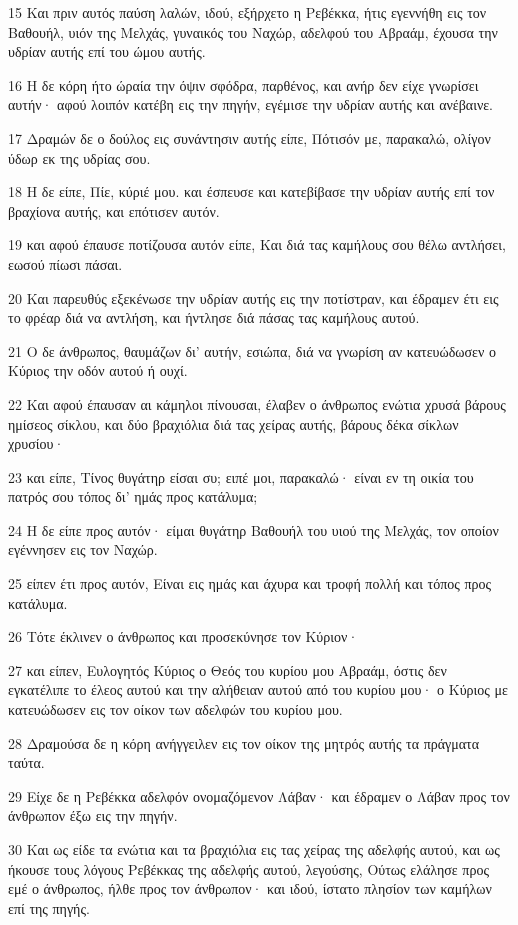 \par 15 Και πριν αυτός παύση λαλών, ιδού, εξήρχετο η Ρεβέκκα, ήτις εγεννήθη εις τον Βαθουήλ, υιόν της Μελχάς, γυναικός του Ναχώρ, αδελφού του Αβραάμ, έχουσα την υδρίαν αυτής επί του ώμου αυτής.
\par 16 Η δε κόρη ήτο ώραία την όψιν σφόδρα, παρθένος, και ανήρ δεν είχε γνωρίσει αυτήν· αφού λοιπόν κατέβη εις την πηγήν, εγέμισε την υδρίαν αυτής και ανέβαινε.
\par 17 Δραμών δε ο δούλος εις συνάντησιν αυτής είπε, Πότισόν με, παρακαλώ, ολίγον ύδωρ εκ της υδρίας σου.
\par 18 Η δε είπε, Πίε, κύριέ μου. και έσπευσε και κατεβίβασε την υδρίαν αυτής επί τον βραχίονα αυτής, και επότισεν αυτόν.
\par 19 και αφού έπαυσε ποτίζουσα αυτόν είπε, Και διά τας καμήλους σου θέλω αντλήσει, εωσού πίωσι πάσαι.
\par 20 Και παρευθύς εξεκένωσε την υδρίαν αυτής εις την ποτίστραν, και έδραμεν έτι εις το φρέαρ διά να αντλήση, και ήντλησε διά πάσας τας καμήλους αυτού.
\par 21 Ο δε άνθρωπος, θαυμάζων δι' αυτήν, εσιώπα, διά να γνωρίση αν κατευώδωσεν ο Κύριος την οδόν αυτού ή ουχί.
\par 22 Και αφού έπαυσαν αι κάμηλοι πίνουσαι, έλαβεν ο άνθρωπος ενώτια χρυσά βάρους ημίσεος σίκλου, και δύο βραχιόλια διά τας χείρας αυτής, βάρους δέκα σίκλων χρυσίου·
\par 23 και είπε, Τίνος θυγάτηρ είσαι συ; ειπέ μοι, παρακαλώ· είναι εν τη οικία του πατρός σου τόπος δι' ημάς προς κατάλυμα;
\par 24 Η δε είπε προς αυτόν· είμαι θυγάτηρ Βαθουήλ του υιού της Μελχάς, τον οποίον εγέννησεν εις τον Ναχώρ.
\par 25 είπεν έτι προς αυτόν, Είναι εις ημάς και άχυρα και τροφή πολλή και τόπος προς κατάλυμα.
\par 26 Τότε έκλινεν ο άνθρωπος και προσεκύνησε τον Κύριον·
\par 27 και είπεν, Ευλογητός Κύριος ο Θεός του κυρίου μου Αβραάμ, όστις δεν εγκατέλιπε το έλεος αυτού και την αλήθειαν αυτού από του κυρίου μου· ο Κύριος με κατευώδωσεν εις τον οίκον των αδελφών του κυρίου μου.
\par 28 Δραμούσα δε η κόρη ανήγγειλεν εις τον οίκον της μητρός αυτής τα πράγματα ταύτα.
\par 29 Είχε δε η Ρεβέκκα αδελφόν ονομαζόμενον Λάβαν· και έδραμεν ο Λάβαν προς τον άνθρωπον έξω εις την πηγήν.
\par 30 Και ως είδε τα ενώτια και τα βραχιόλια εις τας χείρας της αδελφής αυτού, και ως ήκουσε τους λόγους Ρεβέκκας της αδελφής αυτού, λεγούσης, Ούτως ελάλησε προς εμέ ο άνθρωπος, ήλθε προς τον άνθρωπον· και ιδού, ίστατο πλησίον των καμήλων επί της πηγής.
